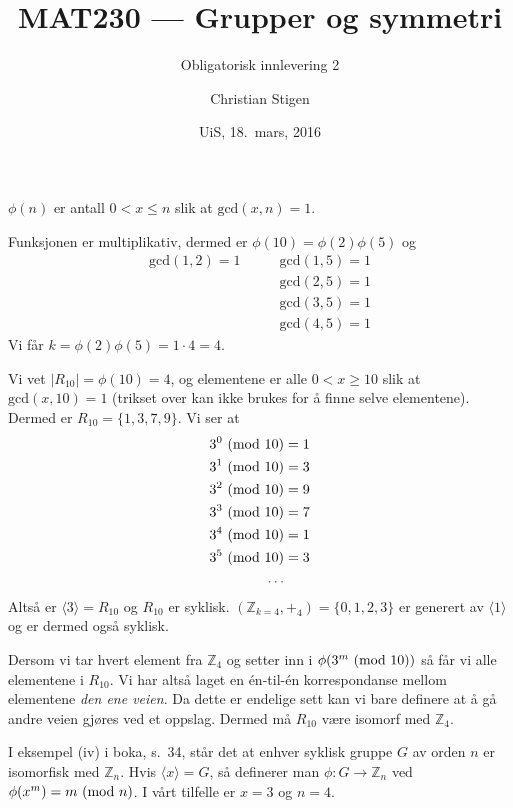 \documentclass[a4paper,norsk,twocolumn,11pt]{article}
\title{MAT230 --- Grupper og symmetri}
\subtitle{Obligatorisk innlevering 2}
\author{Christian Stigen}
\date{UiS, 18.~mars, 2016}
\begin{document}
\maketitle


$\phi{(n)}$ er antall $0 < x \leqslant n$ slik at $\text{gcd}{(x,n)} = 1$.

Funksjonen er multiplikativ, dermed er $\phi{(10)} = \phi{(2)} \phi{(5)}$
og
\begin{align*}
  \text{gcd}(1, 2) = 1 & \qquad\text{gcd}(1, 5) = 1 \\
                       & \qquad\text{gcd}(2, 5) = 1 \\
                       & \qquad\text{gcd}(3, 5) = 1 \\
                       & \qquad\text{gcd}(4, 5) = 1
\end{align*}
Vi får $k = \phi{(2)}\phi{(5)} = 1\cdot4 =4 $.

Vi vet $|R_10| = \phi{(10)} = 4$, og elementene er alle $0<x\geqslant 10$ slik
at $\text{gcd}(x,10)=1$ (trikset over kan ikke brukes for å finne selve
elementene). Dermed er $R_{10} = \{ 1,3,7,9 \}$. Vi ser at
\begin{align*}
  3^0 \ (\text{mod}\ 10) &= 1 \\
  3^1 \ (\text{mod}\ 10) &= 3 \\
  3^2 \ (\text{mod}\ 10) &= 9 \\
  3^3 \ (\text{mod}\ 10) &= 7 \\
  3^4 \ (\text{mod}\ 10) &= 1 \\
  3^5 \ (\text{mod}\ 10) &= 3 \\
  \ldots
\end{align*}
Altså er $\langle 3 \rangle = R_{10}$ og $R_{10}$ er syklisk. 
$(\mathbb{Z}_{k=4}, +_4) = \{0,1,2,3\}$ er generert av $\langle 1 \rangle$ og
er dermed også syklisk.

Dersom vi tar hvert element fra $\mathbb{Z}_4$ og setter inn i
$\phi{(3^m\ (\text{mod}\ 10))}$ så får vi alle elementene i $R_{10}$. Vi har altså laget
en én-til-én korrespondanse mellom elementene \textit{den ene veien}. Da dette
er endelige sett kan vi bare definere at å gå andre veien gjøres ved et
oppslag. Dermed må $R_{10}$ være isomorf med $\mathbb{Z}_4$.

I eksempel (iv) i boka, s.~34, står det at enhver syklisk gruppe $G$ av orden
$n$ er isomorfisk med $\mathbb{Z}_n$. Hvis $\langle x \rangle = G$, så
definerer man $\phi\colon G \rightarrow \mathbb{Z}_n$ ved $\phi{(x^m)} = m
\ (\text{mod}\ n)$. I vårt tilfelle er $x=3$ og $n=4$.
\end{document}
